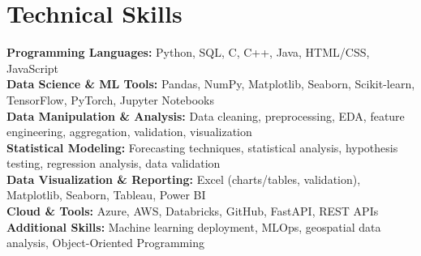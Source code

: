 \documentclass[11pt,letterpaper]{article}
\begin{document}
\section*{Technical Skills}
\textbf{Programming Languages:} Python, SQL, C, C++, Java, HTML/CSS, JavaScript\\
\textbf{Data Science \& ML Tools:} Pandas, NumPy, Matplotlib, Seaborn, Scikit-learn, TensorFlow, PyTorch, Jupyter Notebooks\\
\textbf{Data Manipulation \& Analysis:} Data cleaning, preprocessing, EDA, feature engineering, aggregation, validation, visualization\\
\textbf{Statistical Modeling:} Forecasting techniques, statistical analysis, hypothesis testing, regression analysis, data validation\\
\textbf{Data Visualization \& Reporting:} Excel (charts/tables, validation), Matplotlib, Seaborn, Tableau, Power BI\\
\textbf{Cloud \& Tools:} Azure, AWS, Databricks, GitHub, FastAPI, REST APIs\\
\textbf{Additional Skills:} Machine learning deployment, MLOps, geospatial data analysis, Object-Oriented Programming
\end{document}
